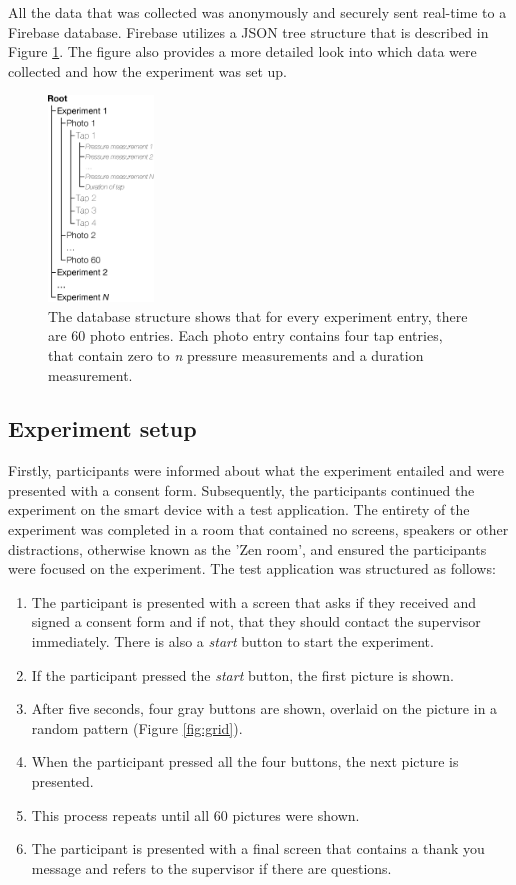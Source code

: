 \documentclass{sigchi}
\begin{document}
All the data that was collected was anonymously and securely sent real-time to a Firebase \cite{google:firebase} database. Firebase utilizes a JSON \cite{json} tree structure that is described in Figure \ref{fig:datastructure}. The figure also provides a more detailed look into which data were collected and how the experiment was set up.
\begin{figure}[t]
    \centering
    \includegraphics[width=0.25\textwidth]{images/Datastructure.eps}
    \caption{The database structure shows that for every experiment entry, there are 60 photo entries. Each photo entry contains four tap entries, that contain zero to \textit{n} pressure measurements and a duration measurement.}
    \label{fig:datastructure}
\end{figure}


\subsection{Experiment setup} %
\label{sub:experiment_setup}
Firstly, participants were informed about what the experiment entailed and were presented with a consent form. Subsequently, the participants continued the experiment on the smart device with a test application. The entirety of the experiment was completed in a room that contained no screens, speakers or other distractions, otherwise known as the 'Zen room', and ensured the participants were focused on the experiment. The test application was structured as follows:
\begin{enumerate}
  \item The participant is presented with a screen that asks if they received and signed a consent form and if not, that they should contact the supervisor immediately. There is also a \textit{start} button to start the experiment.
  \item If the participant pressed the \textit{start} button, the first picture is shown.
  \item After five seconds, four gray buttons are shown, overlaid on the picture in a random pattern (Figure \ref{fig:grid}).
  \item When the participant pressed all the four buttons, the next picture is presented.
  \item This process repeats until all 60 pictures were shown.
  \item The participant is presented with a final screen that contains a thank you message and refers to the supervisor if there are questions.
\end{enumerate}
\end{document}
